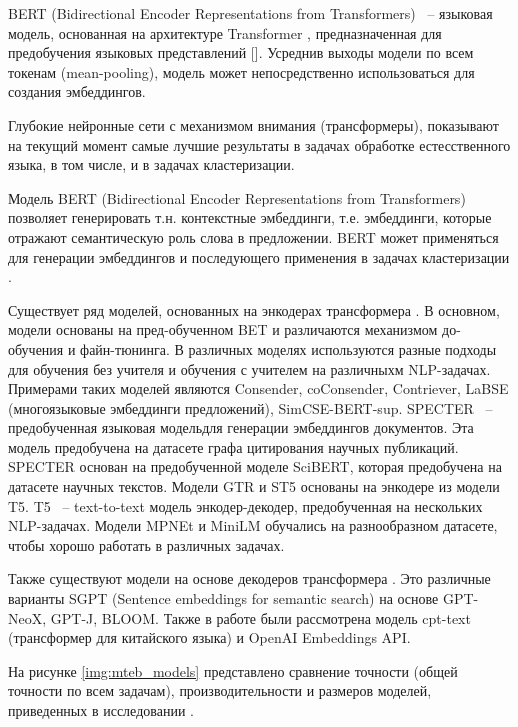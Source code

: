BERT (Bidirectional Encoder Representations from Transformers) ~-- языковая модель, основанная на архитектуре Transformer , предназначенная для предобучения языковых представлений [\cite{bert}]. Усреднив выходы модели по всем токенам (mean-pooling), модель может непосредственно использоваться для создания эмбеддингов.

Глубокие нейронные сети с механизмом внимания (трансформеры), показывают на текущий момент самые лучшие результаты в задачах обработке естесственного языка, в том числе, и в задачах кластеризации.

Модель BERT (Bidirectional Encoder Representations from Transformers) позволяет генерировать т.н. контекстные эмбеддинги, т.е. эмбеддинги, которые отражают семантическую роль слова в предложении. BERT может применяться для генерации эмбеддингов и последующего применения в задачах кластеризации \cite{text-clustering-with-bert}.

Существует ряд моделей, основанных на энкодерах трансформера \cite{mteb}. В основном, модели основаны на пред-обученном BET и различаются механизмом до-обучения и файн-тюнинга. В различных моделях используются разные подходы для обучения без учителя и обучения с учителем на различныхм NLP-задачах. Примерами таких моделей являются Consender, coConsender, Contriever, LaBSE (многоязыковые эмбеддинги предложений), SimCSE-BERT-sup.  SPECTER ~-- предобученная языковая модельдля генерации эмбеддингов документов. Эта модель предобучена на датасете графа цитирования научных публикаций. SPECTER основан на предобученной моделе SciBERT, которая предобучена на датасете научных текстов. Модели GTR и ST5 основаны на энкодере из модели T5. T5 ~-- text-to-text модель энкодер-декодер, предобученная на нескольких NLP-задачах. Модели MPNEt и MiniLM обучались на разнообразном датасете, чтобы хорошо работать в различных задачах.

Также существуют модели на основе декодеров трансформера \cite{mteb}. Это различные варианты SGPT (Sentence embeddings for semantic search) на основе GPT-NeoX, GPT-J, BLOOM. Также в работе были рассмотрена модель cpt-text (трансформер для китайского языка) и OpenAI Embeddings API.

На рисунке \ref{img:mteb_models} представлено сравнение точности (общей точности по всем задачам), производительности и размеров моделей, приведенных в исследовании \cite{mteb}.

